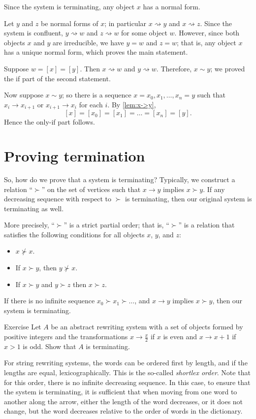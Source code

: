 Since the system is terminating, any object $x$ has a normal form.

Let $y$ and $z$ be normal forms of $x$;
in particular $x\rightsquigarrow y$ and $x\rightsquigarrow z$.
Since the system is confluent, $y\rightsquigarrow w$ and $z\rightsquigarrow w$ for some object $w$.
However, since both objects $x$ and $y$ are irreducible, we have $y= w$ and $z= w$;
that is, any object $x$ has a unique normal form, which proves the main statement.

Suppose $w=[x]=[y]$.
Then $x\rightsquigarrow w$ and $y\rightsquigarrow w$.
Therefore, $x\sim y$;
we proved the if part of the second statement.

Now suppose $x\sim y$;
so there is a sequence $x=x_0,x_1,\dots,x_n=y$ such that $x_i\to x_{i+1}$ or $x_{i+1}\to x_i$ for each $i$.
By \ref{lem:x->y},
\[[x]=[x_0]=[x_1]=\dots=[x_n]=[y].\]
Hence the only-if part follows.
\qeds

\section{Proving termination}

So, how do we prove that a system is terminating?
Typically, we construct a relation ``$\succ$'' on the set of vertices such that 
$x \to y$ implies $x\succ y$.
If any decreasing sequence with respect to $\succ$ is terminating,
then our original system is terminating as well. 

More precisely, ``$\succ$'' is a strict partial order;
that is, ``$\succ$'' is a relation that satisfies the following conditions for all objects $x$, $y$, and $z$:
\begin{itemize}
\item $x\nsucc x$.
\item If $x\succ y$, then  $y\nsucc x$.
\item If $x\succ y$ and $y\succ z$ then  $x\succ z$.
\end{itemize}
If there is no infinite sequence $x_0\succ x_1\succ\dots$,
and $x\to y$ implies $x\succ y$, then our system is terminating.

\begin{thm}{Exercise}\label{ex:x+1}
Let $A$ be an abstract rewriting system
with a set of objects formed by positive integers 
and the transformations $x\to \tfrac x2$ if $x$ is even and $x\to x+1$ if $x>1$ is odd.
Show that $A$ is terminating.
\end{thm}

For string rewriting systems, the words can be ordered first by length, and if the lengths are equal, lexicographically.
This is the so-called \emph{shortlex order}.
Note that for this order, there is no infinite decreasing sequence.
In this case, to ensure that the system is terminating, it is sufficient that when moving from one word to another along the arrow, either the length of the word decreases, or it does not change, but the word decreases relative to the order of words in the dictionary.


